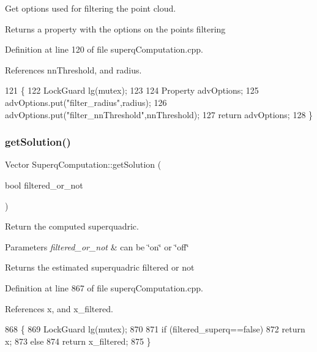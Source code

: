 Get options used for filtering the point cloud. 

\begin{DoxyReturn}{Returns}
a property with the options on the points filtering 
\end{DoxyReturn}


Definition at line 120 of file superq\+Computation.\+cpp.



References nn\+Threshold, and radius.


\begin{DoxyCode}
121 \{
122     LockGuard lg(mutex);
123 
124     Property advOptions;
125     advOptions.put(\textcolor{stringliteral}{"filter\_radius"},radius);
126     advOptions.put(\textcolor{stringliteral}{"filter\_nnThreshold"},nnThreshold);
127     \textcolor{keywordflow}{return} advOptions;
128 \}
\end{DoxyCode}
\mbox{\label{classSuperqComputation_aa659eda30d49322192be2565f44c0fb9}} 
\subsubsection{\texorpdfstring{get\+Solution()}{getSolution()}}
{\footnotesize\ttfamily Vector Superq\+Computation\+::get\+Solution (\begin{DoxyParamCaption}\item[{bool}]{filtered\+\_\+or\+\_\+not }\end{DoxyParamCaption})}



Return the computed superquadric. 


\begin{DoxyParams}{Parameters}
{\em filtered\+\_\+or\+\_\+not} & can be \char`\"{}on\char`\"{} or \char`\"{}off\char`\"{} \\
\hline
\end{DoxyParams}
\begin{DoxyReturn}{Returns}
the estimated superquadric filtered or not 
\end{DoxyReturn}


Definition at line 867 of file superq\+Computation.\+cpp.



References x, and x\+\_\+filtered.


\begin{DoxyCode}
868 \{
869     LockGuard lg(mutex);
870 
871     \textcolor{keywordflow}{if} (filtered\_superq==\textcolor{keyword}{false})
872         \textcolor{keywordflow}{return} x;
873     \textcolor{keywordflow}{else}
874         \textcolor{keywordflow}{return} x_filtered;
875 \}
\end{DoxyCode}
\mbox{\label{classSuperqComputation_a1f93a7688ef418d2ca9402cff5621048}} 
